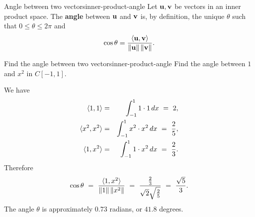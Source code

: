 \begin{definition}{Angle between two vectors}{inner-product-angle}
  Let $\vect{u},\vect{v}$ be vectors in an inner product space.
  The \textbf{angle}%
   between $\vect{u}$ and
  $\vect{v}$ is, by definition, the unique $\theta$ such that
  $0\leq\theta\leq 2\pi$ and
  \begin{equation*}
    \cos\theta = \frac{\iprod{\vect{u},\vect{v}}}{\norm{\vect{u}}\norm{\vect{v}}}.
  \end{equation*}
\end{definition}

\begin{example}{Find the angle between two vectors}{inner-product-angle}
  Find the angle between $1$ and $x^2$ in $C[-1,1]$.
\end{example}

\begin{solution}
  We have
  \begin{eqnarray*}
    \langle1,1\rangle &=& \int_{-1}^1 1\cdot 1\,dx ~=~ 2, \\
    \langle x^2,x^2\rangle &=& \int_{-1}^1 x^2\cdot x^2\,dx ~=~ \frac{2}{5}, \\
    \langle1, x^2\rangle &=& \int_{-1}^1 1\cdot x^2\,dx ~=~ \frac{2}{3}.
  \end{eqnarray*}
  Therefore
  \begin{equation*}
    \cos\theta
    ~=~ \frac{\langle1,x^2\rangle}{\left\|1\right\|\left\|x^2\right\|}
    ~=~ \frac{\frac{2}{3}}{\sqrt{2}\sqrt{\frac{2}{5}}}
    ~=~ \frac{\sqrt{5}}{3}.
  \end{equation*}
  The angle $\theta$ is approximately $0.73$ radians, or $41.8$ degrees.
  
\end{solution}
